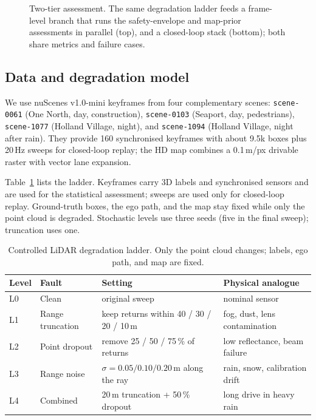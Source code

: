 \documentclass[10pt,a4paper]{article}
\begin{document}
\begin{figure}[t]
\caption{Two-tier assessment. The same degradation ladder feeds a frame-level branch that runs the safety-envelope and map-prior assessments in parallel (top), and a closed-loop stack (bottom); both share metrics and failure cases.}
\label{fig:pipeline}
\end{figure}

\subsection{Data and degradation model}

We use nuScenes v1.0-mini keyframes from four complementary scenes: \texttt{scene-0061} (One North, day, construction), \texttt{scene-0103} (Seaport, day, pedestrians), \texttt{scene-1077} (Holland Village, night), and \texttt{scene-1094} (Holland Village, night after rain). They provide 160 synchronised keyframes with about 9.5k boxes plus 20\,Hz sweeps for closed-loop replay; the HD map combines a 0.1\,m/px drivable raster with vector lane expansion.

Table~\ref{tab:degradation} lists the ladder. Keyframes carry 3D labels and synchronised sensors and are used for the statistical assessment; sweeps are used only for closed-loop replay. Ground-truth boxes, the ego path, and the map stay fixed while only the point cloud is degraded. Stochastic levels use three seeds (five in the final sweep); truncation uses one.

\begin{table}[t]
\centering
\footnotesize
\caption{Controlled LiDAR degradation ladder. Only the point cloud changes; labels, ego path, and map are fixed.}
\label{tab:degradation}
\begin{tabularx}{\linewidth}{@{}l l X l@{}}
\toprule
\textbf{Level} & \textbf{Fault} & \textbf{Setting} & \textbf{Physical analogue}\\
\midrule
L0 & Clean & original sweep & nominal sensor\\
L1 & Range truncation & keep returns within 40 / 30 / 20 / 10\,m & fog, dust, lens contamination\\
L2 & Point dropout & remove 25 / 50 / 75\,\% of returns & low reflectance, beam failure\\
L3 & Range noise & $\sigma = 0.05 / 0.10 / 0.20$\,m along the ray & rain, snow, calibration drift\\
L4 & Combined & 20\,m truncation + 50\,\% dropout & long drive in heavy rain\\
\bottomrule
\end{tabularx}
\end{table}
\end{document}
